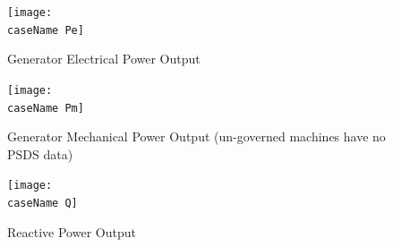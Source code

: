 \documentclass[12pt]{article}
\begin{document}
%
\pagebreak
	\begin{figure}[h!]
			\centering
			\texttt{[image: \\caseName Pe]}\vspace{-.5em}
			\caption{Generator Electrical Power Output}
			\label{\caseName Pe}		 
	\end{figure}%
	\begin{figure}[h!]
			\centering
			\texttt{[image: \\caseName Pm]}\vspace{-.5em}
			\caption{Generator Mechanical Power Output (un-governed machines have no PSDS data)}
			\label{\caseName Pm}		 
	\end{figure}%

	\begin{figure}[h!]
			\centering
			\texttt{[image: \\caseName Q]}\vspace{-.5em}
			\caption{Reactive Power Output}
			\label{\caseName Q}		 
	\end{figure}%
\end{document}
